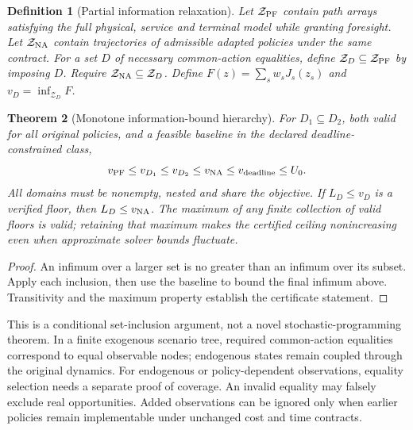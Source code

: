\documentclass[11pt,letterpaper]{article}
\newtheorem{coathm}{Theorem}[section]
\newtheorem{coadef}[coathm]{Definition}
\begin{document}
\begin{coadef}[Partial information relaxation]
Let $\mathcal Z_{\rm PF}$ contain path arrays satisfying the full physical, service and terminal model while granting foresight. Let $\mathcal Z_{\rm NA}$ contain trajectories of admissible adapted policies under the same contract. For a set $D$ of necessary common-action equalities, define $\mathcal Z_D\subseteq\mathcal Z_{\rm PF}$ by imposing $D$. Require $\mathcal Z_{\rm NA}\subseteq\mathcal Z_D$. Define $F(z)=\sum_s w_sJ_s(z_s)$ and $v_D=\inf_{\mathcal Z_D}F$.
\end{coadef}
\begin{coathm}[Monotone information-bound hierarchy]
\label{thm:partialna}
For $D_1\subseteq D_2$, both valid for all original policies, and a feasible baseline in the declared deadline-constrained class,
\[
 v_{\rm PF}\le v_{D_1}\le v_{D_2}\le v_{\rm NA}
 \le v_{\rm deadline}\le U_0 .
\]
All domains must be nonempty, nested and share the objective. If $L_D\le v_D$ is a verified floor, then $L_D\le v_{\rm NA}$. The maximum of any finite collection of valid floors is valid; retaining that maximum makes the certified ceiling nonincreasing even when approximate solver bounds fluctuate.
\end{coathm}
\begin{proof}An infimum over a larger set is no greater than an infimum over its subset. Apply each inclusion, then use the baseline to bound the final infimum above. Transitivity and the maximum property establish the certificate statement.\end{proof}
This is a conditional set-inclusion argument, not a novel stochastic-programming theorem. In a finite exogenous scenario tree, required common-action equalities correspond to equal observable nodes; endogenous states remain coupled through the original dynamics. For endogenous or policy-dependent observations, equality selection needs a separate proof of coverage. An invalid equality may falsely exclude real opportunities. Added observations can be ignored only when earlier policies remain implementable under unchanged cost and time contracts.
\end{document}
